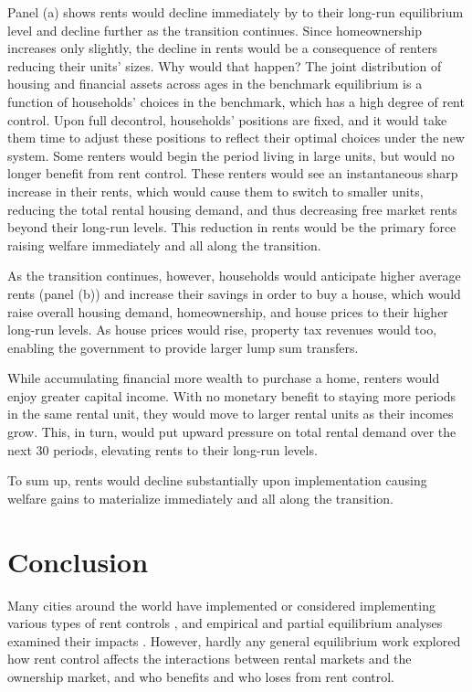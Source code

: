 \documentclass[parskip=full]{article}
\begin{document}
Panel (a) shows rents would decline immediately by to their long-run equilibrium level and decline further as the transition continues. Since homeownership increases only slightly, the decline in rents would be a consequence of renters reducing their units' sizes. Why would that happen? The joint distribution of housing and financial assets across ages in the benchmark equilibrium is a function of households' choices in the benchmark, which has a high degree of rent control. Upon full decontrol, households' positions are fixed, and it would take them time to adjust these positions to reflect their optimal choices under the new system. Some renters would begin the period living in large units, but would no longer benefit from rent control. These renters would see an instantaneous sharp increase in their rents, which would cause them to switch to smaller units, reducing the total rental housing demand, and thus decreasing free market rents beyond their long-run levels. This reduction in rents would be the primary force raising welfare immediately and all along the transition. 

As the transition continues, however, households would anticipate higher average rents (panel (b)) and increase their savings in order to buy a house, which would raise overall housing demand, homeownership, and house prices to their higher long-run levels. As house prices would rise, property tax revenues would too, enabling the government to provide larger lump sum transfers.

While accumulating financial more wealth to purchase a home, renters would enjoy greater capital income. With no monetary benefit to staying more periods in the same rental unit, they would move to larger rental units as their incomes grow. This, in turn, would put upward pressure on total rental demand over the next 30 periods, elevating rents to their long-run levels.

To sum up, rents would decline substantially upon implementation causing welfare gains to materialize immediately and all along the transition. 

\section{Conclusion}\label{sec:conclusion}

Many cities around the world have implemented or considered implementing various types of rent controls \citep{fraser-1981}, and empirical and partial equilibrium analyses examined their impacts \citep{hayek-1929,fs-1946,fallis-1985,diamond-2019}. However, hardly any general equilibrium work explored how rent control affects the interactions between rental markets and the ownership market, and who benefits and who loses from rent control. 
\end{document}
